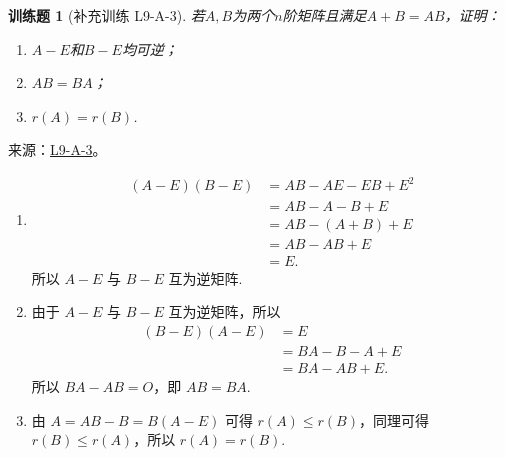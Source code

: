\documentclass[12pt,fontset=fandol]{ctexart}
\newtheorem{exercise}{训练题}[section]
\begin{document}
\begin{exercise}[补充训练 L9-A-3]\label{prob:L9-A-3}
若$A,B$为两个$n$阶矩阵且满足$A+B=AB$，证明：
        \begin{enumerate}
            \item $A-E$和$B-E$均可逆；

            \item $AB=BA$；

            \item $r(A)=r(B)$.
        \end{enumerate}
\end{exercise}
\noindent 来源：\href{https://github.com/yhwu-is/Linear-Algebra-Left-Undone/blob/new/%E8%AE%B2%E4%B9%89/%E4%B8%93%E9%A2%98/9%20%E7%9F%A9%E9%98%B5%E8%BF%90%E7%AE%97%E8%BF%9B%E9%98%B6.tex}{L9-A-3}。
\begin{solve}
\begin{enumerate}
                \item \begin{align*}
                          (A - E)(B - E) & = AB - AE - EB + E^2 \\
                                         & = AB - A - B + E     \\
                                         & = AB - (A + B) + E   \\
                                         & = AB - AB + E        \\
                                         & = E.
                      \end{align*}
                      所以 $ A - E $ 与 $ B - E $ 互为逆矩阵.

                \item 由于 $ A - E $ 与 $ B - E $ 互为逆矩阵，所以
                      \begin{align*}
                          (B - E)(A - E) & = E              \\
                                         & = BA - B - A + E \\
                                         & = BA - AB + E.
                      \end{align*}
                      所以 $ BA - AB = O $，即 $ AB = BA $.

                \item 由 $ A = AB - B = B(A - E) $ 可得 $ r(A) \leqslant r(B) $，同理可得 $ r(B) \leqslant r(A) $，所以 $ r(A) = r(B) $.
            \end{enumerate}
\end{solve}
\end{document}
